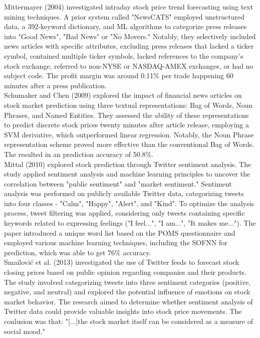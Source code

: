 Mittermayer (2004) investigated intraday stock price trend forecasting using text mining techniques. A prior system called "NewsCATS" employed unstructured data, a 392-keyword dictionary, and \ac{ML} algorithms to categorize press releases into "Good News", "Bad News" or "No Movers." Notably, they selectively included news articles with specific attributes, excluding press releases that lacked a ticker symbol, contained multiple ticker symbols, lacked references to the company's stock exchange, referred to non-NYSE or NASDAQ-AMEX exchanges, or had no subject code. The profit margin was around 0.11\% per trade happening 60 minutes after a press publication.\cite{mittermayer2004}\\

Schumaker and Chen (2009) explored the impact of financial news articles on stock market prediction using three textual representations: Bag of Words, Noun Phrases, and Named Entities. They assessed the ability of these representations to predict discrete stock prices twenty minutes after article release, employing a \ac{SVM} derivative, which outperformed linear regression. Notably, the Noun Phrase representation scheme proved more effective than the conventional Bag of Words. The resulted in an prediction accuracy of 50.8\%.\cite{schumaker2009textual}\\

Mittal (2010) explored stock prediction through Twitter sentiment analysis. The study applied sentiment analysis and machine learning principles to uncover the correlation between "public sentiment" and "market sentiment." Sentiment analysis was performed on publicly available Twitter data, categorizing tweets into four classes - "Calm", "Happy", "Alert", and "Kind". To optimize the analysis process, tweet filtering was applied, considering only tweets containing specific keywords related to expressing feelings ("I feel...", "I am...", "It makes me..."). The paper introduced a unique word list based on the \ac{POMS} questionnaire and employed various machine learning techniques, including the  \ac{SOFNN} for prediction, which was able to get 76\% accuracy.\cite{Mittal2011StockPU}\\

Smailović et al. (2013) investigated the use of Twitter feeds to forecast stock closing prices based on public opinion regarding companies and their products. The study involved categorizing tweets into three sentiment categories (positive, negative, and neutral) and explored the potential influence of emotions on stock market behavior. The research aimed to determine whether sentiment analysis of Twitter data could provide valuable insights into stock price movements. The conlusion was that: "[...]the stock market itself can be considered as a measure of social mood."\cite{smailovic2013predictive}\\

